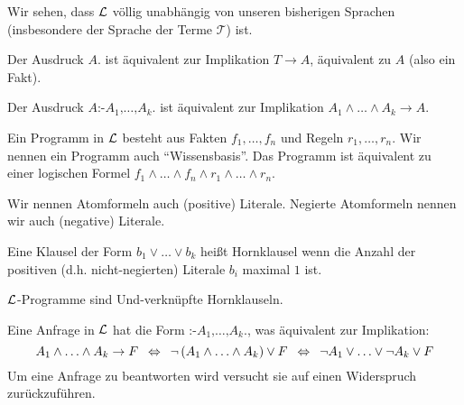 Wir sehen, dass $\mathcal{L}$ völlig unabhängig von unseren bisherigen Sprachen (insbesondere der Sprache der Terme $\mathcal{T}$) ist.

\begin{defn} \quad 
\begin{\whichenum}
\item Der Ausdruck $A\texttt{.}$ ist äquivalent zur Implikation $T \to A$, äquivalent zu $A$ (also ein Fakt).
\item Der Ausdruck $A  \texttt{:-}  A_1  \texttt{,}  \ldots  \texttt{,}  A_k  \texttt{.}$ ist äquivalent zur Implikation $A_1 \wedge \ldots \wedge A_k \to A$.
\item Ein Programm in $\mathcal{L}$ besteht aus Fakten $f_1,\ldots,f_n$ und Regeln $r_1,\ldots,r_n$. Wir nennen ein Programm auch ``Wissensbasis''.
Das Programm ist äquivalent zu einer logischen Formel $f_1 \wedge \ldots \wedge f_n \wedge r_1 \wedge \ldots \wedge r_n$.
\end{\whichenum}
\end{defn}

\begin{defn}[Literal]
Wir nennen Atomformeln auch (positive) Literale.
Negierte Atomformeln nennen wir auch (negative) Literale.
\end{defn}

\begin{defn}[Hornklausel]
Eine Klausel der Form $b_1 \vee \ldots \vee b_k$ heißt Hornklausel wenn die Anzahl der positiven (d.h. nicht-negierten)
Literale $b_i$ maximal $1$ ist.
\end{defn}

$\mathcal{L}$-Programme sind Und-verknüpfte Hornklauseln.

\begin{defn}
Eine Anfrage in $\mathcal{L}$ hat die Form $\texttt{:-}  A_1  \texttt{,}  \ldots  \texttt{,}  A_k  \texttt{.}$,
was äquivalent zur Implikation:
\[A_1 \wedge \ldots \wedge A_k \to F \; \:\Leftrightarrow\: \; \neg \left(A_1 \wedge \ldots \wedge A_k\right) \vee F \; \:\Leftrightarrow\: \; \neg A_1 \vee \ldots \vee \neg A_k \vee F\]
Um eine Anfrage zu beantworten wird versucht sie auf einen Widerspruch zurückzuführen.
\end{defn}

